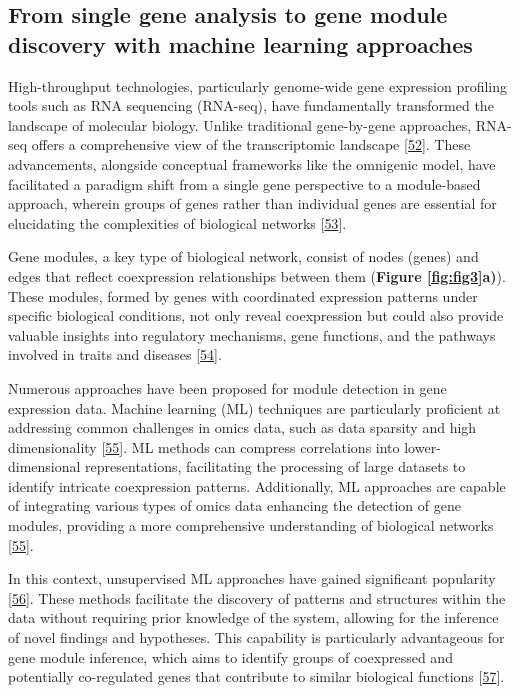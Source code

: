 \hypertarget{from-single-gene-analysis-to-gene-module-discovery-with-machine-learning-approaches}{%
\subsection{From single gene analysis to gene module discovery with machine learning approaches}\label{from-single-gene-analysis-to-gene-module-discovery-with-machine-learning-approaches}}

High-throughput technologies, particularly genome-wide gene expression profiling tools such as RNA sequencing (RNA-seq), have fundamentally transformed the landscape of molecular biology.
Unlike traditional gene-by-gene approaches, RNA-seq offers a comprehensive view of the transcriptomic landscape {[}\protect\hyperlink{ref-Zm8nV5AC}{52}{]}.
These advancements, alongside conceptual frameworks like the omnigenic model, have facilitated a paradigm shift from a single gene perspective to a module-based approach, wherein groups of genes rather than individual genes are essential for elucidating the complexities of biological networks {[}\protect\hyperlink{ref-SD886fuE}{53}{]}.

Gene modules, a key type of biological network, consist of nodes (genes) and edges that reflect coexpression relationships between them (\textbf{Figure \ref{fig:fig3}a)}).
These modules, formed by genes with coordinated expression patterns under specific biological conditions, not only reveal coexpression but could also provide valuable insights into regulatory mechanisms, gene functions, and the pathways involved in traits and diseases {[}\protect\hyperlink{ref-QUI8V4RY}{54}{]}.

Numerous approaches have been proposed for module detection in gene expression data.
Machine learning (ML) techniques are particularly proficient at addressing common challenges in omics data, such as data sparsity and high dimensionality {[}\protect\hyperlink{ref-K4KeL4gw}{55}{]}.
ML methods can compress correlations into lower-dimensional representations, facilitating the processing of large datasets to identify intricate coexpression patterns.
Additionally, ML approaches are capable of integrating various types of omics data enhancing the detection of gene modules, providing a more comprehensive understanding of biological networks {[}\protect\hyperlink{ref-K4KeL4gw}{55}{]}.

In this context, unsupervised ML approaches have gained significant popularity {[}\protect\hyperlink{ref-Ko8gMp8P}{56}{]}.
These methods facilitate the discovery of patterns and structures within the data without requiring prior knowledge of the system, allowing for the inference of novel findings and hypotheses.
This capability is particularly advantageous for gene module inference, which aims to identify groups of coexpressed and potentially co-regulated genes that contribute to similar biological functions {[}\protect\hyperlink{ref-1BVbSrr6M}{57}{]}.

